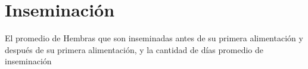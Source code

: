 \section{Inseminación}
El promedio de Hembras que son inseminadas antes de su primera alimentación y después de su primera
alimentación, y la cantidad de días promedio de inseminación
